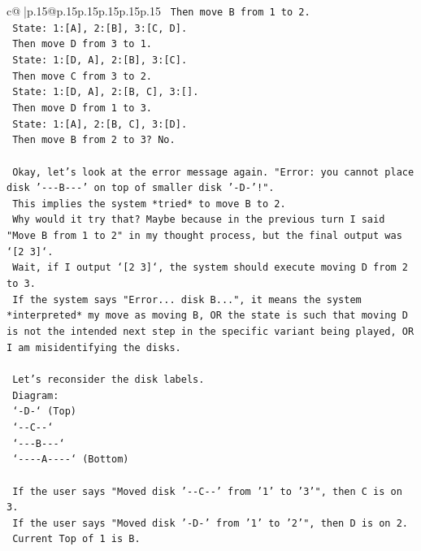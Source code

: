 \documentclass{article}
\begin{document}
{\begin{supertabular}{c@{$\;$}|p{.15\linewidth}@{}p{.15\linewidth}p{.15\linewidth}p{.15\linewidth}p{.15\linewidth}p{.15\linewidth}}
{{{\texttt{   Then move B from 1 to 2.} \\
\texttt{   State: 1:{[}A{]}, 2:{[}B{]}, 3:{[}C, D{]}.} \\
\texttt{   Then move D from 3 to 1.} \\
\texttt{   State: 1:{[}D, A{]}, 2:{[}B{]}, 3:{[}C{]}.} \\
\texttt{   Then move C from 3 to 2.} \\
\texttt{   State: 1:{[}D, A{]}, 2:{[}B, C{]}, 3:{[}{]}.} \\
\texttt{   Then move D from 1 to 3.} \\
\texttt{   State: 1:{[}A{]}, 2:{[}B, C{]}, 3:{[}D{]}.} \\
\texttt{   Then move B from 2 to 3? No.} \\
\\ 
\texttt{   Okay, let's look at the error message again. "Error: you cannot place disk '{-}{-}{-}B{-}{-}{-}' on top of smaller disk '{-}D{-}'!".} \\
\texttt{   This implies the system *tried* to move B to 2.} \\
\texttt{   Why would it try that? Maybe because in the previous turn I said "Move B from 1 to 2" in my thought process, but the final output was `{[}2 3{]}`.} \\
\texttt{   Wait, if I output `{[}2 3{]}`, the system should execute moving D from 2 to 3.} \\
\texttt{   If the system says "Error... disk B...", it means the system *interpreted* my move as moving B, OR the state is such that moving D is not the intended next step in the specific variant being played, OR I am misidentifying the disks.} \\
\\ 
\texttt{   Let's reconsider the disk labels.} \\
\texttt{   Diagram:} \\
\texttt{   `{-}D{-}` (Top)} \\
\texttt{   `{-}{-}C{-}{-}`} \\
\texttt{   `{-}{-}{-}B{-}{-}{-}`} \\
\texttt{   `{-}{-}{-}{-}A{-}{-}{-}{-}` (Bottom)} \\
\\ 
\texttt{   If the user says "Moved disk '{-}{-}C{-}{-}' from '1' to '3'", then C is on 3.} \\
\texttt{   If the user says "Moved disk '{-}D{-}' from '1' to '2'", then D is on 2.} \\
\texttt{   Current Top of 1 is B.} \\
}}}
\end{supertabular}}
\end{document}
